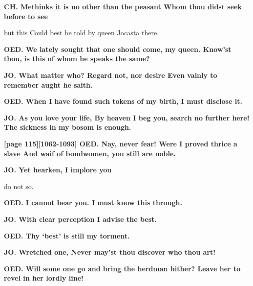 \documentclass[11pt,letter]{book}
\begin{document}
\par \textbf{CH. Methinks it is no other than the peasant Whom thou didst seek before to see}
\par   but this Could best be told by queen Jocasta there.

\par \textbf{OED. We lately sought that one should come, my queen. Know’st thou, is this of whom he speaks the same?}
\par 

\par \textbf{JO. What matter who? Regard not, nor desire Even vainly to remember aught he saith.}
\par 

\par \textbf{OED. When I have found such tokens of my birth, I must disclose it.}
\par 

\par \textbf{JO. As you love your life, By heaven I beg you, search no further here! The sickness in my bosom is enough.}
\par 

\par \textbf{[page 115][1062-1093] OED. Nay, never fear! Were I proved thrice a slave And waif of bondwomen, you still are noble.}
\par 

\par \textbf{JO. Yet hearken, I implore you}
\par   do not so.

\par \textbf{OED. I cannot hear you. I must know this through.}
\par 

\par \textbf{JO. With clear perception I advise the best.}
\par 

\par \textbf{OED. Thy ‘best’ is still my torment.}
\par 

\par \textbf{JO. Wretched one, Never may’st thou discover who thou art!}
\par 

\par \textbf{OED. Will some one go and bring the herdman hither? Leave her to revel in her lordly line!}
\par 
\end{document}
